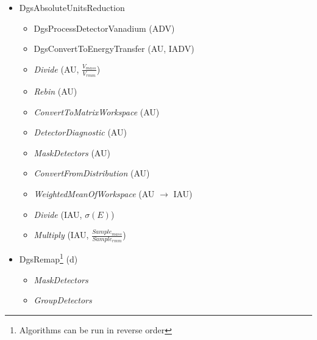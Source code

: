\begin{itemize}
\item DgsAbsoluteUnitsReduction
\begin{itemize}
\item DgsProcessDetectorVanadium (ADV)
\item DgsConvertToEnergyTransfer (AU, IADV)
\item \textit{Divide} (AU, $\frac{V_{mass}}{V_{rmm}}$)
\item \textit{Rebin} (AU)
\item \textit{ConvertToMatrixWorkspace} (AU)
\item \textit{DetectorDiagnostic} (AU)
\item \textit{MaskDetectors} (AU)
\item \textit{ConvertFromDistribution} (AU)
\item \textit{WeightedMeanOfWorkspace} (AU $\rightarrow$ IAU)
\item \textit{Divide} (IAU, $\sigma(E)$)
\item \textit{Multiply} (IAU, $\frac{Sample_{mass}}{Sample_{rmm}}$)
\end{itemize}
\end{itemize}

\begin{itemize}
\item DgsRemap\footnote{Algorithms can be run in reverse order} (d)
\begin{itemize}
\item \textit{MaskDetectors}
\item \textit{GroupDetectors}
\end{itemize}
\end{itemize}
